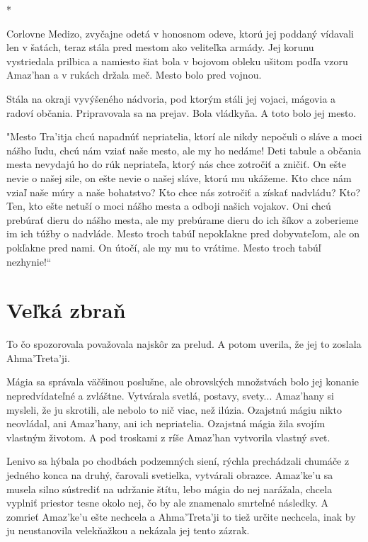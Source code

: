 \documentclass{book}
\begin{document}
\begin{center}
*
\end{center}

Corlovne Medizo, zvyčajne odetá v honosnom odeve, ktorú jej poddaný vídavali len v šatách, teraz stála pred mestom ako veliteľka armády. Jej korunu vystriedala prilbica a namiesto šiat bola v bojovom obleku ušitom podľa vzoru Amaz'han a v rukách držala meč. Mesto bolo pred vojnou.

Stála na okraji vyvýšeného nádvoria, pod ktorým stáli jej vojaci, mágovia a radoví občania. Pripravovala sa na prejav. Bola vládkyňa. A toto bolo jej mesto.

"$ $Mesto Tra'itja chcú napadnúť nepriatelia, ktorí ale nikdy nepočuli o sláve a moci nášho ľudu, chcú nám vziať naše mesto, ale my ho nedáme! Deti tabule a občania mesta nevydajú ho do rúk nepriateľa, ktorý nás chce zotročiť a zničiť. On ešte nevie o našej sile, on ešte nevie o našej sláve, ktorú mu ukážeme. Kto chce nám vziaľ naše múry a naše bohatstvo? Kto chce nás zotročiť a získať nadvládu? Kto? Ten, kto ešte netuší o moci nášho mesta a odboji našich vojakov. Oni chcú prebúrať dieru do nášho mesta, ale my prebúrame dieru do ich šíkov a zoberieme im ich túžby o nadvláde. Mesto troch tabúľ nepokľakne pred dobyvateľom, ale on pokľakne pred nami. On útočí, ale my mu to vrátime. Mesto troch tabúľ nezhynie!“

\chapter{Veľká zbraň}

To čo spozorovala považovala najskôr za prelud. A potom uverila, že jej to zoslala Ahma'Treta'ji.

Mágia sa správala väčšinou poslušne, ale obrovských množstvách bolo jej konanie nepredvídateľné a zvláštne. Vytvárala svetlá, postavy, svety... Amaz'hany si mysleli, že ju skrotili, ale nebolo to nič viac, než ilúzia. Ozajstnú mágiu nikto neovládal, ani Amaz'hany, ani ich nepriatelia. Ozajstná mágia žila svojím vlastným životom. A pod troskami z ríše Amaz'han vytvorila vlastný svet.

Lenivo sa hýbala po chodbách podzemných siení, rýchla prechádzali chumáče z jedného konca na druhý, čarovali svetielka, vytvárali obrazce. Amaz'ke'u sa musela silno sústrediť na udržanie štítu, lebo mágia do nej narážala, chcela vyplniť priestor tesne okolo nej, čo by ale znamenalo smrteľné následky. A zomrieť Amaz'ke'u ešte nechcela a Ahma'Treta'ji to tiež určite nechcela, inak by ju neustanovila velekňažkou a nekázala jej tento zázrak.
\end{document}
